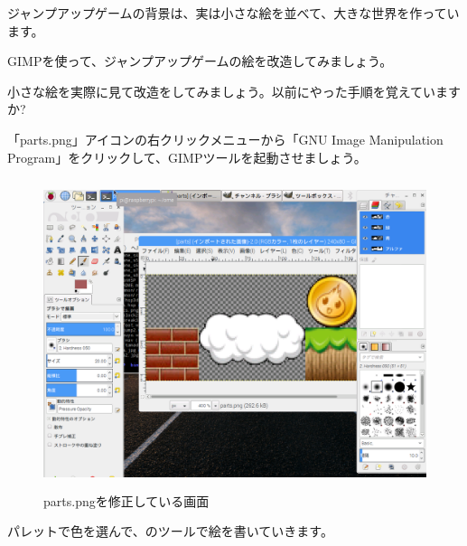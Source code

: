 \begin{description}
    \item {}
\end{description}



ジャンプアップゲームの背景は、実は小さな絵を並べて、大きな世界を作っています。

GIMPを使って、ジャンプアップゲームの絵を改造してみましょう。

小さな絵を実際に見て改造をしてみましょう。以前にやった手順を覚えていますか?

「parts.png」アイコンの右クリックメニューから「GNU Image Manipulation Program」をクリックして、GIMPツールを起動させましょう。


\begin{figure}[H]
    \begin{center}
      \includegraphics[keepaspectratio,width=12.065cm,height=9.049cm]{text04-img/s_gimpeditjumppart.png}
      \caption{parts.pngを修正している画面}
    \end{center}
    \label{fig:prog_menu}
\end{figure}

パレットで色を選んで、のツールで絵を書いていきます。


